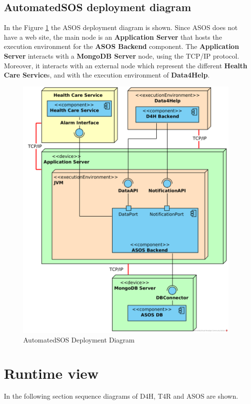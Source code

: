 \documentclass[a4paper, hidelinks, 12pt]{report}
\begin{document}
	\subsection{AutomatedSOS deployment diagram}
	In the Figure \ref{fig:asos_deployment_diagram} the ASOS deployment diagram is shown. Since ASOS does not have a web site, the main node is an \textbf{Application Server} that hosts the execution environment for the \textbf{ASOS Backend} component. The \textbf{Application Server} interacts with a \textbf{MongoDB Server} node, using the TCP/IP protocol. Moreover, it interacts with an external node which represent the different \textbf{Health Care Service}s, and with the execution environment of \textbf{Data4Help}.
		\begin{figure}[H]
			\centering
			\includegraphics[width=1\textwidth]{diagrams/asos_deployment_diagram.png}
			\caption[AutomatedSOS Deployment Diagram]{AutomatedSOS Deployment Diagram}
			\label{fig:asos_deployment_diagram}
		\end{figure}	
	
	\section{Runtime view}
	In the following section sequence diagrams of D4H, T4R and ASOS are shown. 
	
\end{document}
